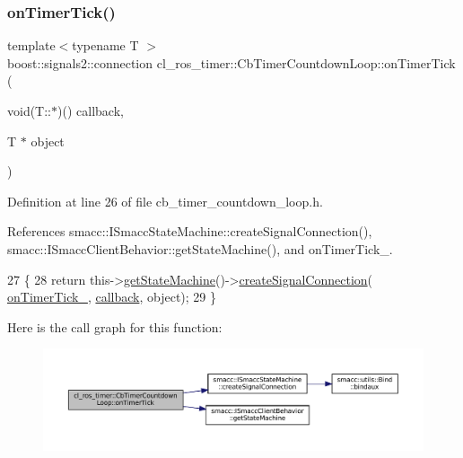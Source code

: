 \subsubsection{\texorpdfstring{on\+Timer\+Tick()}{onTimerTick()}}
{\footnotesize\ttfamily template$<$typename T $>$ \\
boost\+::signals2\+::connection cl\+\_\+ros\+\_\+timer\+::\+Cb\+Timer\+Countdown\+Loop\+::on\+Timer\+Tick (\begin{DoxyParamCaption}\item[{void(T\+::$\ast$)()}]{callback,  }\item[{T $\ast$}]{object }\end{DoxyParamCaption})\hspace{0.3cm}{\ttfamily [inline]}}



Definition at line 26 of file cb\+\_\+timer\+\_\+countdown\+\_\+loop.\+h.



References smacc\+::\+I\+Smacc\+State\+Machine\+::create\+Signal\+Connection(), smacc\+::\+I\+Smacc\+Client\+Behavior\+::get\+State\+Machine(), and on\+Timer\+Tick\+\_\+.


\begin{DoxyCode}
27     \{
28         \textcolor{keywordflow}{return} this->\hyperlink{classsmacc_1_1ISmaccClientBehavior_a9d55a85bf0a920033805a3c050de2019}{getStateMachine}()->\hyperlink{classsmacc_1_1ISmaccStateMachine_adf0f42ade0c65cc471960fe2a7c42da2}{createSignalConnection}(
      \hyperlink{classcl__ros__timer_1_1CbTimerCountdownLoop_a9df6547f8ddf45107d8850d8a1a92cf4}{onTimerTick\_}, \hyperlink{sm__ridgeback__barrel__search__1_2servers_2opencv__perception__node_2opencv__perception__node_8cpp_a050e697bd654facce10ea3f6549669b3}{callback}, \textcolor{keywordtype}{object});
29     \}
\end{DoxyCode}
Here is the call graph for this function\+:
\nopagebreak
\begin{figure}[H]
\begin{center}
\leavevmode
\includegraphics[width=350pt]{classcl__ros__timer_1_1CbTimerCountdownLoop_ad251cc8444ca7070f64658bbb77e1275_cgraph}
\end{center}
\end{figure}


